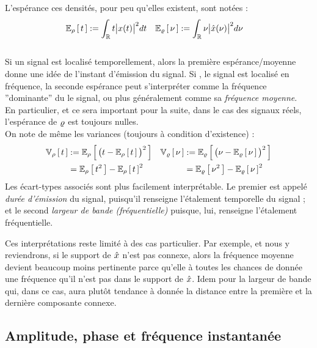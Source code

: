 \begin{definition}\label{def:band-width}
	L'espérance ces densités, pour peu qu'elles existent, sont notées :
	\begin{align*}
		\esp[\densit]{t} &\defeq \int_\R t \big|x(t)\big|^2 dt   &  \esp[\densis]{\nu} &\defeq \int_\R \nu \big|\fou{x}(\nu)\big|^2 d\nu
	\end{align*}
	\\
	Si un signal est localisé temporellement, alors la première espérance/moyenne donne une idée de l'instant d'émission du signal. Si \acontrario, le signal est localisé en fréquence, la seconde espérance peut s'interpréter comme la fréquence ''dominante'' du le signal, ou plus généralement comme sa \emph{fréquence moyenne}. \\
	En particulier, et ce sera important pour la suite, dans le cas des signaux réels, l'espérance de $\densis$ est toujours nulles.
	\\
	On note de même les variances (toujours à condition d'existence) :
	\begin{align*}
		\var[\densit]{t} &\defeq \esp[\densit]{\big(t-\esp[\densit]{t}\big)^2}  &  \var[\densis]{\nu} &\defeq \esp[\densis]{\big(\nu - \esp[\densis]{\nu}\big)^2}\\
		& = \esp[\densit]{t^2} - \esp[\densit]{t}^2  &  &= \esp[\densis]{\nu^2} - \esp[\densis]{\nu}^2
	\end{align*}
	Les écart-types associés sont plus facilement interprétable. Le premier est appelé \emph{durée d'émission} du signal, puisqu'il renseigne l'étalement temporelle du signal ; et le second \emph{largeur de bande (fréquentielle)} puisque, lui, renseigne l'étalement fréquentielle. 
\end{definition}

Ces interprétations reste limité à des cas particulier. Par exemple, et nous y reviendrons, si le support de $\fou{x}$ n'est pas connexe, alors la fréquence moyenne devient beaucoup moins pertinente parce qu'elle à toutes les chances de donnée une fréquence qu'il n'est pas dans le support de $\fou{x}$. Idem pour la largeur de bande qui, dans ce cas, aura plutôt tendance à donnée la distance entre la première et la dernière composante connexe.
\\



\subsection{Amplitude, phase et fréquence instantanée}\label{sec:freq_instant}

